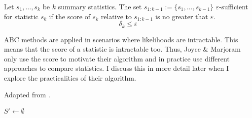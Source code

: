 \documentclass[11pt,a4paper]{article}
\theoremstyle{break}
\begin{document}
  \begin{box_definition}\label{def_approximate_suffiency}
    Let $s_1,\dots,s_k$ be $k$ summary statistics. The set $s_{1:k-1}:=\{s_1,\dots,s_{k-1}\}$ $\varepsilon$-sufficient for statistic $s_k$ if the score of $s_k$ relative to $s_{1:k-1}$ is no greater that $\varepsilon$.
    \[ \delta_k\leq\varepsilon \]
  \end{box_definition}

  \par ABC methods are applied in scenarios where likelihoods are intractable. This means that the score of a statistic is intractable too. Thus, Joyce \& Marjoram only use the score to motivate their algorithm and in practice use different approaches to compare statistics. I discuss this in more detail later when I explore the practicalities of their algorithm. %

  \begin{box_algorithm}\label{alg_approximately_sufficient_subsets}
    Adapted from \cite[]{Approximately_sufficient_statistics_and_bayesian_computation}.
    \begin{algorithm}[H]
      $S'\leftarrow\emptyset$\\
    \end{algorithm}
  \end{box_algorithm}
\end{document}
